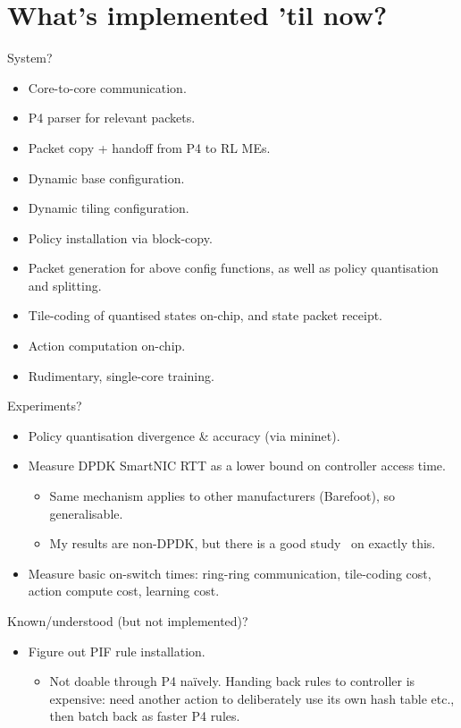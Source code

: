 \documentclass[sigconf,natbib=false]{acmart}
\begin{document}
\section{What's implemented 'til now?}
System?
\begin{itemize}
	\item Core-to-core communication.
	\item P4 parser for relevant packets.
	\item Packet copy + handoff from P4 to RL MEs.
	\item Dynamic base configuration.
	\item Dynamic tiling configuration.
	\item Policy installation via block-copy.
	\item Packet generation for above config functions, as well as policy quantisation and splitting.
	\item Tile-coding of quantised states on-chip, and state packet receipt.
	\item Action computation on-chip.
	\item Rudimentary, single-core training.
\end{itemize}

Experiments?
\begin{itemize}
	\item Policy quantisation divergence \& accuracy (via mininet).
	\item Measure DPDK SmartNIC RTT as a lower bound on controller access time.
	\begin{itemize}
		\item Same mechanism applies to other manufacturers (Barefoot), so generalisable.
		\item My results are non-DPDK, but there is a good study~\parencite{DBLP:conf/sigcomm/NeugebauerAZAL018} on exactly this.
	\end{itemize}
	\item Measure basic on-switch times: ring-ring communication, tile-coding cost, action compute cost, learning cost.
\end{itemize}

Known/understood (but not implemented)?
\begin{itemize}
	\item Figure out PIF rule installation.
	\begin{itemize}
		\item Not doable through P4 na\"{i}vely. Handing back rules to controller is expensive: need another action to deliberately use its own hash table etc., then batch back as faster P4 rules.
	\end{itemize}
\end{itemize}
\end{document}
